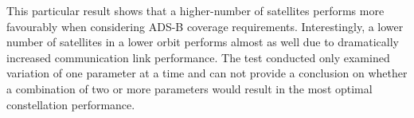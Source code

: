 This particular result shows that a higher-number of satellites performs more favourably when considering ADS-B coverage requirements. Interestingly, a lower number of satellites in a lower orbit performs almost as well due to dramatically increased communication link performance. The test conducted only examined variation of one parameter at a time and can not provide a conclusion on whether a combination of two or more parameters would result in the most optimal constellation performance.
